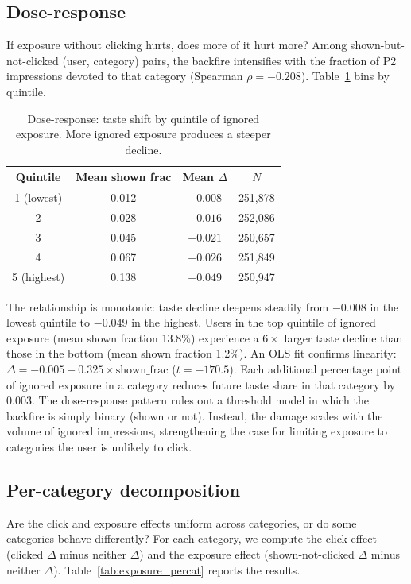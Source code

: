 \documentclass[11pt]{article}
\begin{document}
\subsection{Dose-response}

If exposure without clicking hurts, does more of it hurt more? Among shown-but-not-clicked (user, category) pairs, the backfire intensifies with the fraction of P2 impressions devoted to that category (Spearman $\rho = -0.208$). Table~\ref{tab:doseresponse} bins by quintile.

\begin{table}[ht]
\centering
\caption{Dose-response: taste shift by quintile of ignored exposure. More ignored exposure produces a steeper decline.}
\label{tab:doseresponse}
\begin{tabular}{cccc}
\toprule
Quintile & Mean shown frac & Mean $\Delta$ & $N$ \\
\midrule
1 (lowest) & 0.012 & $-0.008$ & 251,878 \\
2 & 0.028 & $-0.016$ & 252,086 \\
3 & 0.045 & $-0.021$ & 250,657 \\
4 & 0.067 & $-0.026$ & 251,849 \\
5 (highest) & 0.138 & $\mathbf{-0.049}$ & 250,947 \\
\bottomrule
\end{tabular}
\end{table}
\FloatBarrier

The relationship is monotonic: taste decline deepens steadily from $-0.008$ in the lowest quintile to $-0.049$ in the highest. Users in the top quintile of ignored exposure (mean shown fraction 13.8\%) experience a $6\times$ larger taste decline than those in the bottom (mean shown fraction 1.2\%). An OLS fit confirms linearity: $\Delta = -0.005 - 0.325 \times \text{shown\_frac}$ ($t = -170.5$). Each additional percentage point of ignored exposure in a category reduces future taste share in that category by 0.003. The dose-response pattern rules out a threshold model in which the backfire is simply binary (shown or not). Instead, the damage scales with the volume of ignored impressions, strengthening the case for limiting exposure to categories the user is unlikely to click.

\subsection{Per-category decomposition}

Are the click and exposure effects uniform across categories, or do some categories behave differently? For each category, we compute the click effect (clicked $\Delta$ minus neither $\Delta$) and the exposure effect (shown-not-clicked $\Delta$ minus neither $\Delta$). Table~\ref{tab:exposure_percat} reports the results.
\end{document}
